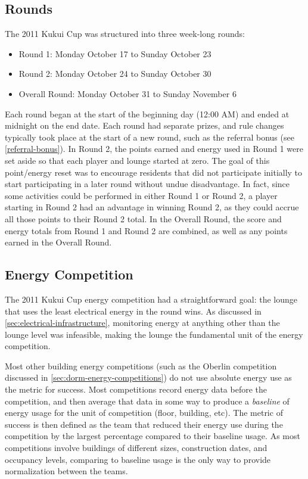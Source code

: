 \subsection{Rounds}

The 2011 Kukui Cup was structured into three week-long rounds:

\begin{itemize}
	\item Round 1: Monday October 17 to Sunday October 23
	\item Round 2: Monday October 24 to Sunday October 30
	\item Overall Round: Monday October 31 to Sunday November 6
\end{itemize}

Each round began at the start of the beginning day (12:00 AM) and ended at midnight on the end date. Each round had separate prizes, and rule changes typically took place at the start of a new round, such as the referral bonus (see \autoref{referral-bonus}). In Round 2, the points earned and energy used in Round 1 were set aside so that each player and lounge started at zero. The goal of this point/energy reset was to encourage residents that did not participate initially to start participating in a later round without undue disadvantage. In fact, since some activities could be performed in either Round 1 or Round 2, a player starting in Round 2 had an advantage in winning Round 2, as they could accrue all those points to their Round 2 total. In the Overall Round, the score and energy totals from Round 1 and Round 2 are combined, as well as any points earned in the Overall Round.


\subsection{Energy Competition}
\label{sec:energy-competition}

The 2011 Kukui Cup energy competition had a straightforward goal: the lounge that uses the least electrical energy in the round wins. As discussed in \autoref{sec:electrical-infrastructure}, monitoring energy at anything other than the lounge level was infeasible, making the lounge the fundamental unit of the energy competition.

Most other building energy competitions (such as the Oberlin competition discussed in \autoref{sec:dorm-energy-competitions}) do not use absolute energy use as the metric for success. Most competitions record energy data before the competition, and then average that data in some way to produce a \emph{baseline} of energy usage for the unit of competition (floor, building, etc). The metric of success is then defined as the team that reduced their energy use during the competition by the largest percentage compared to their baseline usage. As most competitions involve buildings of different sizes, construction dates, and occupancy levels, comparing to baseline usage is the only way to provide normalization between the teams.

